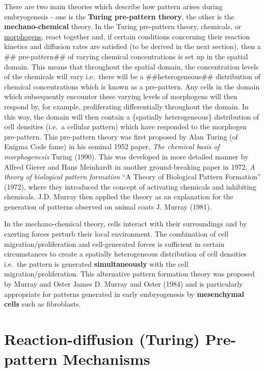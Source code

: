 \documentclass[
  letterpaper,
  DIV=11,
  numbers=noendperiod]{scrreprt}
\theoremstyle{definition}
\theoremstyle{plain}
\theoremstyle{plain}
\theoremstyle{remark}
\begin{document}
There are two main theories which describe how pattern arises during
embryogenesis - one is the \textbf{Turing pre-pattern theory}, the other
is the \textbf{mechano-chemical} theory. In the Turing pre-pattern
theory, chemicals, or
\href{https://en.wikipedia.org/wiki/Morphogen}{morphogens}, react
together and, if certain conditions concerning their reaction kinetics
and diffusion rates are satisfied (to be derived in the next section),
then a \#\# pre-pattern\#\# of varying chemical concentrations is set up
in the spatial domain. This means that throughout the spatial domain,
the concentration levels of the chemicals will vary i.e.~there will be a
\#\#heterogeneous\#\# distribution of chemical concentrations which is
known as a pre-pattern. Any cells in the domain which subsequently
encounter these varying levels of morphogens will then respond by, for
example, proliferating differentially throughout the domain. In this
way, the domain will then contain a \{spatially heterogeneous\}
distribution of cell densities (i.e.~a cellular pattern) which have
responded to the morphogen pre-pattern. This pre-pattern theory was
first proposed by Alan Turing (of Enigma Code fame) in his seminal 1952
paper, \emph{The chemical basis of morphogenesis} Turing (1990). This
was developed in more detailed manner by Alfred Gierer and Hans
Meinhardt in another ground-breaking paper in 1972, \emph{A theory of
biological pattern formation} {``A Theory of Biological Pattern
Formation''} (1972), where they introduced the concept of activating
chemicals and inhibiting chemicals. J.D. Murray then applied the theory
as an explanation for the generation of patterns observed on animal
coats J. Murray (1981).

In the mechano-chemical theory, cells interact with their surroundings
and by exerting forces perturb their local environment. The combination
of cell migration/proliferation and cell-generated forces is sufficient
in certain circumstances to create a spatially heterogeneous
distribution of cell densities i.e.~the pattern is generated
\textbf{simultaneously} with the cell migration/proliferation. This
alternative pattern formation theory was proposed by Murray and Oster
James D. Murray and Oster (1984) and is particularly appropriate for
patterns generated in early embryogenesis by \textbf{mesenchymal cells}
such as fibroblasts.

\hypertarget{reaction-diffusion-turing-pre-pattern-mechanisms}{%
\section{Reaction-diffusion (Turing) Pre-pattern
Mechanisms}\label{reaction-diffusion-turing-pre-pattern-mechanisms}}
\end{document}

